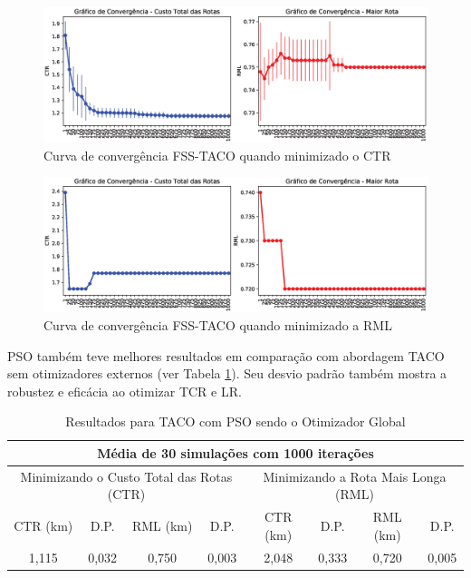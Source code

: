 \begin{figure}[htb]
    \centering
    \caption{Curva de convergência FSS-TACO quando minimizado o CTR} \label{fig:resultados-convergencia-fss-tcr}
    \includegraphics[width=\textwidth]{imagens/convergence-totalcost-fsstaco.eps}
\end{figure}

\begin{figure}[htb]
    \centering
    \caption{Curva de convergência FSS-TACO quando minimizado a RML} \label{fig:resultados-convergencia-fss-rml}
    \includegraphics[width=\textwidth]{imagens/convergence-maxcost-fsstaco.eps}
\end{figure}

PSO também teve melhores resultados em comparação com abordagem TACO sem otimizadores externos (ver Tabela \ref{tab:resultado-psotaco}). Seu desvio padrão também mostra a robustez e eficácia ao otimizar TCR e LR.

\begin{table}[htb]
    \centering
    \caption{Resultados para TACO com PSO sendo o Otimizador Global} \label{tab:resultado-psotaco}
\begin{tabular}{|c|c|c|c|c|c|c|c|}
\hline
\multicolumn{8}{|c|}{Média de 30 simulações com 1000 iterações}                                                            \\ \hline
\multicolumn{4}{|c|}{Minimizando o Custo Total das Rotas (CTR)} & \multicolumn{4}{c|}{Minimizando a Rota Mais Longa (RML)} \\ \hline
CTR (km)    & D.P.   & RML (km)  & D.P.   & CTR (km)  & D.P.     & RML (km)  & D.P.        \\ \hline
1,115       & 0,032  & 0,750     & 0,003  & 2,048     & 0,333    & 0,720     & 0,005       \\ \hline
\end{tabular}
\end{table}


